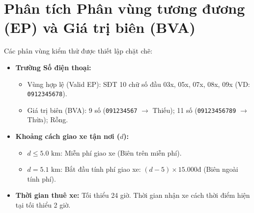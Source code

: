 \documentclass[12pt,a4paper,oneside]{report}
\begin{document}
\section{Phân tích Phân vùng tương đương (EP) và Giá trị biên (BVA)}
Các phân vùng kiểm thử được thiết lập chặt chẽ:
\begin{itemize}
  \item \textbf{Trường Số điện thoại:} 
    \begin{itemize}
      \item Vùng hợp lệ (Valid EP): SĐT 10 chữ số đầu 03x, 05x, 07x, 08x, 09x (VD: \texttt{0912345678}).
      \item Giá trị biên (BVA): 9 số (\texttt{091234567} $\to$ Thiếu); 11 số (\texttt{09123456789} $\to$ Thừa); Rỗng.
    \end{itemize}
  \item \textbf{Khoảng cách giao xe tận nơi ($d$):}
    \begin{itemize}
      \item $d \le 5.0\text{ km}$: Miễn phí giao xe (Biên trên miễn phí).
      \item $d = 5.1\text{ km}$: Bắt đầu tính phí giao xe: $(d - 5) \times 15.000$đ (Biên ngoài tính phí).
    \end{itemize}
  \item \textbf{Thời gian thuê xe:} Tối thiểu 24 giờ. Thời gian nhận xe cách thời điểm hiện tại tối thiểu 2 giờ.
\end{itemize}
\end{document}
